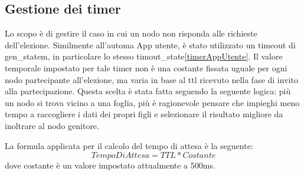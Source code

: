 \subsection{Gestione dei timer} \label{timer_elezione}
Lo scopo è di gestire il caso in cui un nodo non risponda alle richieste dell'elezione. Similmente all'automa App utente, è stato utilizzato un timeout di gen\_statem, in particolare lo stesso timout\_state\ref{timerAppUtente}. 
Il valore temporale impostato per tale timer non è una costante fissata uguale per ogni nodo partecipante all'elezione, ma varia in base al ttl ricevuto nella fase di invito alla partecipazione. Questa scelta è stata fatta seguendo la seguente logica: più un nodo si trova vicino a una foglia, più è ragionevole pensare che impieghi meno tempo a raccogliere i dati dei propri figli e selezionare il risultato migliore da inoltrare al nodo genitore.

La formula applicata per il calcolo del tempo di attesa è la seguente:
\begin{equation}
	TempoDiAttesa = TTL * Costante
\end{equation}
dove costante è un valore impostato attualmente a 500ms.
